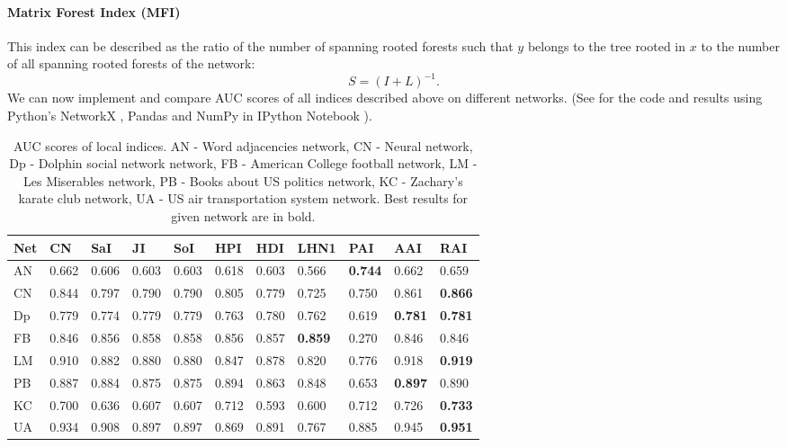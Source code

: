 \documentclass{llncs}
\begin{document}
\paragraph{Matrix Forest Index (MFI) \cite{mf-index}}
%
This index can be described as the ratio of the number of spanning rooted forests such that $y$ belongs to the tree rooted in $x$ to the number of all spanning rooted forests of the network:
\begin{equation}
S = (I + L)^{-1}.
\end{equation}
%
We can now implement and compare AUC scores of all indices described above on different networks. (See \cite{ipynb-auc} for the code and results using Python's NetworkX \cite{networkx}, Pandas \cite{pandas} and NumPy \cite{numpy} in IPython Notebook \cite{ipython}).
%
\setlength{\tabcolsep}{5pt}
\renewcommand{\arraystretch}{1.5}
\begin{table}
\begin{center}
\caption{AUC scores of local indices. AN - Word adjacencies network\cite{adjnoun-net}, CN - Neural network\cite{celneur-net}, Dp - Dolphin social network network\cite{dolph-net}, FB - American College football network\cite{foot-net}, LM - Les Miserables network\cite{lesmis-net}, PB - Books about US politics network\cite{polbook-net}, KC - Zachary's karate club network\cite{karate-net}, UA - US air transportation system network\cite{usair-net}. Best results for given network are in bold.}
\begin{tabular}{| l | l | l | l | l | l | l | l | l | l | l |}
\hline
Net & CN & SaI & JI & SoI & HPI & HDI & LHN1 & PAI & AAI & RAI \\ \hline
AN & 0.662 & 0.606 & 0.603 & 0.603 & 0.618 & 0.603 & 0.566 & \textbf{0.744} & 0.662 & 0.659 \\ \hline
CN & 0.844 & 0.797 & 0.790 & 0.790 & 0.805 & 0.779 & 0.725 & 0.750 & 0.861 & \textbf{0.866} \\ \hline
Dp & 0.779 & 0.774 & 0.779 & 0.779 & 0.763 & 0.780 & 0.762 & 0.619 & \textbf{0.781} & \textbf{0.781} \\ \hline
FB & 0.846 & 0.856 & 0.858 & 0.858 & 0.856 & 0.857 & \textbf{0.859} & 0.270 & 0.846 & 0.846 \\ \hline
LM & 0.910 & 0.882 & 0.880 & 0.880 & 0.847 & 0.878 & 0.820 & 0.776 & 0.918 & \textbf{0.919} \\ \hline
PB & 0.887 & 0.884 & 0.875 & 0.875 & 0.894 & 0.863 & 0.848 & 0.653 & \textbf{0.897} & 0.890 \\ \hline
KC & 0.700 & 0.636 & 0.607 & 0.607 & 0.712 & 0.593 & 0.600 & 0.712 & 0.726 & \textbf{0.733} \\ \hline
UA & 0.934 & 0.908 & 0.897 & 0.897 & 0.869 & 0.891 & 0.767 & 0.885 & 0.945 & \textbf{0.951} \\ 
\hline
\end{tabular}
\end{center}
\end{table}
\end{document}
